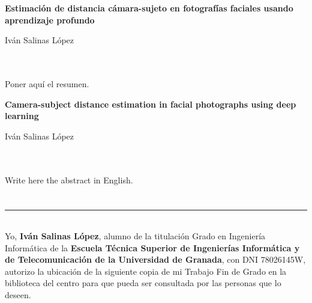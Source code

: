 \chapter*{}
\thispagestyle{empty}



\begin{center}
{\large\bfseries Estimación de distancia cámara-sujeto en fotografías faciales usando aprendizaje profundo}\\
\end{center}
\begin{center}
Iván Salinas López\\
\end{center}

\\

\vspace{0.7cm}
\\

Poner aquí el resumen.
\cleardoublepage


\thispagestyle{empty}


\begin{center}
{\large\bfseries Camera-subject distance estimation in facial photographs using deep learning}\\
\end{center}
\begin{center}
Iván Salinas López\\
\end{center}

\\

\vspace{0.7cm}
\\

Write here the abstract in English.

\chapter*{}
\thispagestyle{empty}

\noindent\rule[-1ex]{\textwidth}{2pt}\\[4.5ex]

Yo, \textbf{Iván Salinas López}, alumno de la titulación Grado en Ingeniería Informática de la \textbf{Escuela Técnica Superior de Ingenierías Informática y de Telecomunicación de la Universidad de Granada}, con DNI 78026145W, autorizo la ubicación de la siguiente copia de mi Trabajo Fin de Grado en la biblioteca del centro para que pueda ser consultada por las personas que lo deseen.

